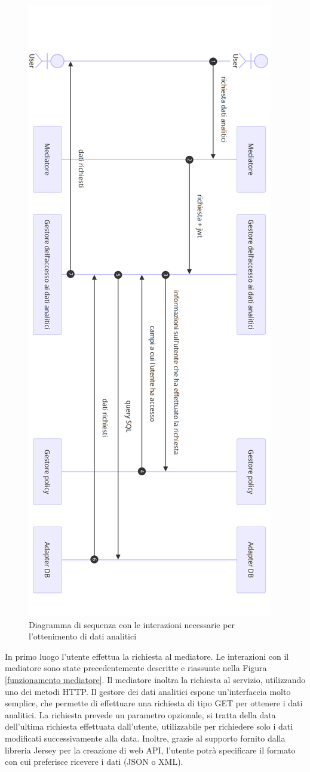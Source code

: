 \documentclass[a4paper,12pt]{report}
\begin{document}
\begin{figure}[H]
    \centering
    \includegraphics[width=0.5\linewidth]{immagini/Gestore Dati analtici.png}
    \caption{Diagramma di sequenza con le interazioni necessarie per l'ottenimento di dati analitici}
    \label{fig:sequenza dati analitici}
\end{figure}
In primo luogo l'utente effettua la richiesta al mediatore. 
Le interazioni con il mediatore sono state precedentemente descritte e riassunte nella Figura \ref{funzionamento mediatore}.
Il mediatore inoltra la richiesta al servizio, utilizzando uno dei metodi HTTP.
Il gestore dei dati analitici espone un'interfaccia molto semplice, che permette di effettuare una richiesta di tipo GET per ottenere i dati analitici.
La richiesta prevede un parametro opzionale, si tratta della data dell'ultima richiesta effettuata dall'utente, utilizzabile per richiedere solo i dati modificati successivamente alla data.
Inoltre, grazie al supporto fornito dalla libreria Jersey per la creazione di web API, l'utente potrà specificare il formato con cui preferisce ricevere i dati (JSON o XML).
\end{document}
